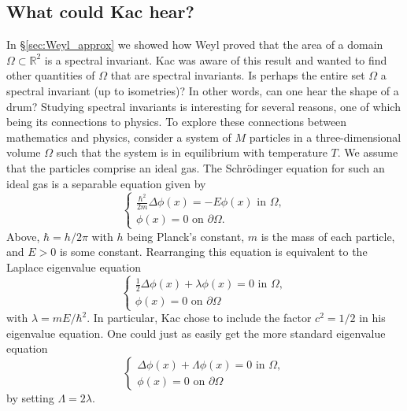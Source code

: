 \documentclass{amsart}
\theoremstyle{definition}
\newcommand*{\R}{\mathbb{R}}
\begin{document}
\subsection{What could Kac hear?} \label{sec:Kac_paper}
In \S \ref{sec:Weyl_approx} we showed how Weyl proved that the area of a domain $\Omega \subset \R^2$ is a spectral invariant. Kac was aware of this result and wanted to find other quantities of $\Omega$ that are spectral invariants. Is perhaps the entire set $\Omega$ a spectral invariant (up to isometries)? In other words, can one hear the shape of a drum? Studying spectral invariants is interesting for several reasons, one of which being its connections to physics. To explore these connections between mathematics and physics, consider a system of $M$ particles in a three-dimensional volume $\Omega$ such that the system is in equilibrium with temperature $T$. We assume that the particles comprise an ideal gas.  The Schrödinger equation for such an ideal gas is a separable equation given by 
\begin{equation} \label{eq:Schrödinger}
    \begin{cases}
        \frac{\hbar^2}{2m}\Delta \phi(x) = -E\phi(x) \text{ in } \Omega, \\ %
        \phi(x) = 0 \text{ on } \partial\Omega.
    \end{cases}
\end{equation}
Above, $\hbar = h/2\pi$ with $h$ being Planck's constant, $m$ is the mass of each particle, and $E > 0$ is some constant. Rearranging this equation is equivalent to the Laplace eigenvalue equation 
\begin{equation} \label{eq:Shrödinger_rearrange}
    \begin{cases}
        \frac{1}{2}\Delta \phi(x) + \lambda \phi(x) = 0 
        \text{ in } \Omega, \\ %
        \phi(x) = 0 \text{ on } \partial\Omega
    \end{cases}
\end{equation}
with $\lambda = mE/\hbar^2$. In particular, Kac chose to include the factor $c^2 = 1/2$ in his eigenvalue equation. One could just as easily get the more standard eigenvalue equation 
\begin{equation} \label{eq:Laplace_c^2=1}  
    \begin{cases}
        \Delta \phi(x) + \Lambda \phi(x) = 0 
        \text{ in } \Omega, \\ %
        \phi(x) = 0 \text{ on } \partial\Omega
    \end{cases}
\end{equation}
by setting $\Lambda = 2\lambda$.
\end{document}
